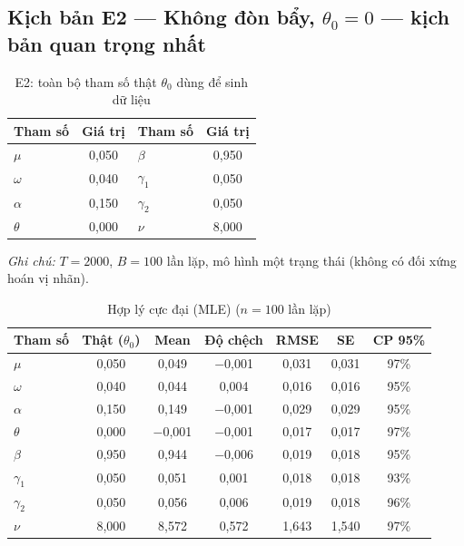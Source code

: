 \documentclass[11pt,a4paper]{article}
\begin{document}
\bigskip

\subsection*{Kịch bản E2 --- Không đòn bẩy, $\theta_0=0$ --- kịch bản quan trọng nhất}
\begin{table}[H]\centering\normalsize
\caption{E2: toàn bộ tham số thật $\theta_0$ dùng để sinh dữ liệu}
\begin{tabularx}{\textwidth}{l C  l C}
\toprule
\textbf{Tham số} & \textbf{Giá trị} & \textbf{Tham số} & \textbf{Giá trị} \\
\midrule
$\mu$ & 0,050 & $\beta$ & 0,950 \\
$\omega$ & 0,040 & $\gamma_1$ & 0,050 \\
$\alpha$ & 0,150 & $\gamma_2$ & 0,050 \\
$\theta$ & 0,000 & $\nu$ & 8,000 \\
\bottomrule
\end{tabularx}
\vspace{0.2em}\raggedright\scriptsize \emph{Ghi chú:} $T=2000$, $B=100$ lần lặp, mô hình một trạng thái (không có đối xứng hoán vị nhãn).
\end{table}

\begin{table}[H]\centering\footnotesize
\caption{Hợp lý cực đại (MLE) ($n=100$ lần lặp)}
\begin{tabularx}{\textwidth}{l C C C C C C}
\toprule
\textbf{Tham số} & \textbf{Thật ($\theta_0$)} & \textbf{Mean} & \textbf{Độ chệch} & \textbf{RMSE} & \textbf{SE} & \textbf{CP 95\%} \\
\midrule
$\mu$ & 0,050 & 0,049 & $-$0,001 & 0,031 & 0,031 & 97\% \\
$\omega$ & 0,040 & 0,044 & 0,004 & 0,016 & 0,016 & 95\% \\
$\alpha$ & 0,150 & 0,149 & $-$0,001 & 0,029 & 0,029 & 95\% \\
$\theta$ & 0,000 & $-$0,001 & $-$0,001 & 0,017 & 0,017 & 97\% \\
$\beta$ & 0,950 & 0,944 & $-$0,006 & 0,019 & 0,018 & 95\% \\
$\gamma_1$ & 0,050 & 0,051 & 0,001 & 0,018 & 0,018 & 93\% \\
$\gamma_2$ & 0,050 & 0,056 & 0,006 & 0,019 & 0,018 & 96\% \\
$\nu$ & 8,000 & 8,572 & 0,572 & 1,643 & 1,540 & 97\% \\
\bottomrule
\end{tabularx}
\end{table}
\end{document}
